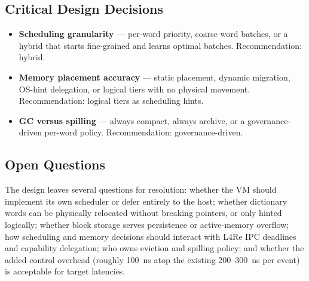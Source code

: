 \subsection{Critical Design Decisions}

\begin{itemize}
  \item \textbf{Scheduling granularity} --- per-word priority, coarse word
        batches, or a hybrid that starts fine-grained and learns optimal batches.
        Recommendation: hybrid.
  \item \textbf{Memory placement accuracy} --- static placement, dynamic
        migration, OS-hint delegation, or logical tiers with no physical movement.
        Recommendation: logical tiers as scheduling hints.
  \item \textbf{GC versus spilling} --- always compact, always archive, or a
        governance-driven per-word policy. Recommendation: governance-driven.
\end{itemize}

\subsection{Open Questions}

The design leaves several questions for resolution: whether the VM should implement
its own scheduler or defer entirely to the host; whether dictionary words can be
physically relocated without breaking pointers, or only hinted logically; whether
block storage serves persistence or active-memory overflow; how scheduling and
memory decisions should interact with L4Re IPC deadlines and capability delegation;
who owns eviction and spilling policy; and whether the added control overhead
(roughly 100~ns atop the existing 200--300~ns per event) is acceptable for target
latencies.

